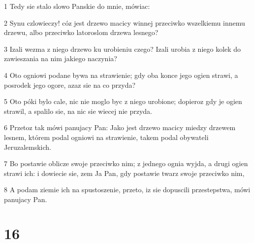 \par 1 Tedy sie stalo slowo Panskie do mnie, mówiac:
\par 2 Synu czlowieczy! cóz jest drzewo macicy winnej przeciwko wszelkiemu innemu drzewu, albo przeciwko latoroslom drzewa lesnego?
\par 3 Izali wezma z niego drzewo ku urobieniu czego? Izali urobia z niego kolek do zawieszania na nim jakiego naczynia?
\par 4 Oto ogniowi podane bywa na strawienie; gdy oba konce jego ogien strawi, a posrodek jego ogore, azaz sie na co przyda?
\par 5 Oto póki bylo cale, nic nie moglo byc z niego urobione; dopieroz gdy je ogien strawil, a spalilo sie, na nic sie wiecej nie przyda.
\par 6 Przetoz tak mówi panujacy Pan: Jako jest drzewo macicy miedzy drzewem lesnem, którem podal ogniowi na strawienie, takem podal obywateli Jeruzalemskich.
\par 7 Bo postawie oblicze swoje przeciwko nim; z jednego ognia wyjda, a drugi ogien strawi ich: i dowiecie sie, zem Ja Pan, gdy postawie twarz swoje przeciwko nim,
\par 8 A podam ziemie ich na spustoszenie, przeto, iz sie dopuscili przestepstwa, mówi panujacy Pan.

\chapter{16}

